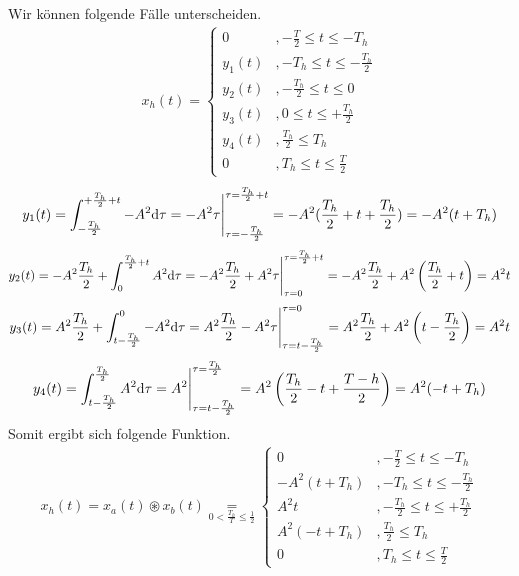\documentclass[11pt,a4paper,DIV=12]{scrartcl}
\begin{document}
Wir können folgende Fälle unterscheiden.
\begin{gather}
	x_{h}(t)=
		\begin{cases}
			0 &, -\frac{T}{2}\leq t \leq -T_h \\
			y_1(t) &,-T_h\leq t \leq -\frac{T_h}{2} \\
			y_2(t) &, -\frac{T_h}{2} \leq t \leq 0 \\
			y_3(t) &, 0 \leq t \leq +\frac{T_h}{2} \\
			y_4(t) &, \frac{T_h}{2}\leq T_h \\
			0 &, T_h \leq t \leq \frac{T}{2}
		\end{cases}
\end{gather}
%
%
\begin{gather}
	y_1(t)=\int_{-\frac{T_h}{2}}^{+\frac{T_h}{2}+t}-A^2\mathrm{d} \tau
	= -A^2\tau \Bigg |_{\tau=-\frac{T_h}{2}}^{\tau=\frac{T_h}{2}+t}
	=-A^2(\frac{T_h}{2}+t+\frac{T_h}{2})
	=-A^2(t+T_h)
\end{gather}
%
%
%
\begin{align}
	y_2(t)=-A^2\frac{T_h}{2}+\int_{0}^{\frac{T_h}{2}+t}A^2\mathrm{d} \tau
	= -A^2\frac{T_h}{2}+A^2\tau\Bigg |_{\tau=0}^{\tau=\frac{T_h}{2}+t}
	=-A^2\frac{T_h}{2}+A^2\left(\frac{T_h}{2}+t\right)
	=A^2t
\end{align}
%
%
\begin{align}
	y_3(t)=A^2\frac{T_h}{2}+\int_{t-\frac{T_h}{2}}^{0}-A^2\mathrm{d} \tau
	=A^2\frac{T_h}{2}-A^2\tau\Bigg |_{\tau=t-\frac{T_h}{2}}^{\tau=0}
	=A^2\frac{T_h}{2}+A^2\left(t-\frac{T_h}{2}\right)
	=A^2t
\end{align}
%
%
\begin{align}
	y_4(t)=\int_{t-\frac{T_h}{2}}^{\frac{T_h}{2}}A^2\mathrm{d} \tau
	=A^2\Bigg |_{\tau=t-\frac{T_h}{2}}^{\tau=\frac{T_h}{2}}
	=A^2\left(\frac{T_h}{2}-t+\frac{T-h}{2}\right)
	=A^2(-t+T_h)
\end{align}
%
%
Somit ergibt sich folgende Funktion.
\begin{gather}
	x_{h}(t)=x_{a}(t)\circledast x_{b}(t)
	\underset{0<\frac{T_h}{T}\leq\frac{1}{2}}{=}
		\begin{cases}
			0 &, -\frac{T}{2}\leq t \leq -T_h \\
			-A^2(t+T_h) &,-T_h\leq t \leq -\frac{T_h}{2} \\
			A^2t &, -\frac{T_h}{2} \leq t \leq +\frac{T_h}{2} \\
			A^2(-t+T_h) &, \frac{T_h}{2}\leq T_h \\
			0 &, T_h \leq t \leq \frac{T}{2}
		\end{cases}
\end{gather}
\end{document}
